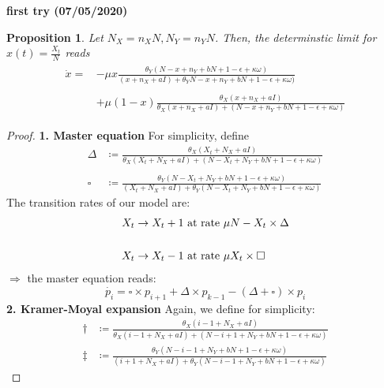\documentclass[10pt,a4paper]{article}
\newtheorem{prop}{Proposition}[section]
\begin{document}
\textbf{first try (07/05/2020)}
\begin{prop}\label{result}
	Let $N_X = n_X N, N_Y = n_Y N$. Then, the determinstic limit for $x\left(t\right) = \frac{X_t}{N}$ reads
	\begin{align}
	\begin{split}
	\dot{x} = &-\mu x\frac{\theta_Y(N-x+n_Y + bN +1-\epsilon+\kappa\omega)}{(x + n_X+aI) + \theta_YN-x+n_Y + bN +1-\epsilon+\kappa\omega)} \\
	&\\
	\qquad &+ \mu\left(1-x\right)\frac{\theta_X (x + n_X + aI)}{\theta_X (x + n_X + aI) + (N-x + n_Y + bN + 1-\epsilon + \kappa\omega)}
		\end{split}
	\end{align} 
\end{prop}
\begin{proof}\phantom{lol}\newline
\textbf{1. Master equation}\newline
For simplicity, define
\begin{align*}
\Delta &\coloneqq\frac{\theta_X (X_t + N_X + aI)}{\theta_X (X_t + N_X + aI) + (N-X_t + N_Y + bN + 1-\epsilon + \kappa\omega)} \\
&\\
\square &\coloneqq\frac{\theta_Y(N-X_t + N_Y + bN +1-\epsilon+\kappa\omega)}{(X_t + N_X + aI) + \theta_Y(N-X_t + N_Y + bN +1-\epsilon+\kappa\omega)}
\end{align*}
The transition rates of our model are:
\begin{align*}\label{def:transition_rates_my_model}
X_t \rightarrow X_t + 1 & \textnormal{ at rate } \mu N-X_t\times \Delta \\
&\\
X_t \rightarrow X_t - 1 & \textnormal{ at rate } \mu X_t\times \square
\end{align*}
$\Rightarrow$ the master equation reads:
\begin{equation}
	\dot{p_i} = \square\times p_{i+1} + \Delta\times p_{k-1} - \left(\Delta + \square\right)\times p_i
\end{equation}
\textbf{2. Kramer-Moyal expansion}\newline
Again, we define for simplicity:
\begin{align*}
\dagger &\coloneqq \frac{\theta_X (i-1 + N_X + aI)}{\theta_X (i-1 + N_X + aI) + (N-i+1 + N_Y + bN + 1-\epsilon + \kappa\omega)}\\
\ddagger &\coloneqq \frac{\theta_Y(N-i-1 + N_Y + bN +1-\epsilon+\kappa\omega)}{(i+1 + N_X+aI) + \theta_Y(N-i-1 + N_Y + bN +1-\epsilon+\kappa\omega)}

\end{align*}
\end{proof}
\end{document}
